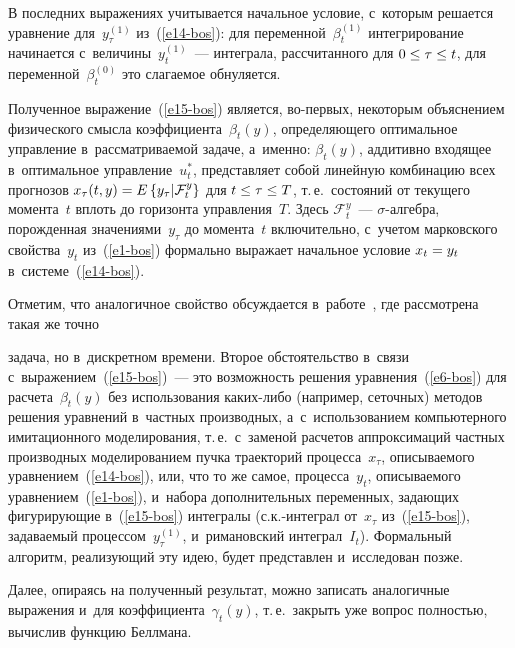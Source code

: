 \begin{multicols}{2}
     В последних выражениях учитывается начальное условие, с~которым 
решается уравнение для~$y_\tau^{(1)}$ из~(\ref{e14-bos}): для 
переменной~$\beta_t^{(1)}$ интегрирование начинается 
с~величины~$y_t^{(1)}$~--- интеграла, рассчитанного для $0\hm\leq \tau\hm\leq 
t$, для переменной~$\beta_t^{(0)}$ это слагаемое обнуляется.
     
     Полученное выражение~(\ref{e15-bos}) является, во-пер\-вых, 
некоторым объяснением физического смысла коэффициента~$\beta_t(y)$, 
определяющего оптимальное управление в~рассматриваемой задаче, 
а~именно: $\beta_t(y)$, аддитивно входящее в~оптимальное 
управление~$u_t^*$, представляет собой линейную комбинацию всех 
прогнозов $x_\tau(t,y)\hm= E\left\{ y_\tau\vert \mathcal{F}_t^y\right\}$ для 
$t\hm\leq \tau\hm\leq T$, т.\,е.\ состояний от текущего момента~$t$ вплоть до 
горизонта управления~$T$. Здесь $\mathcal{F}_t^y$~--- $\sigma$-ал\-геб\-ра, 
порожденная значениями~$y_\tau$ до момента~$t$ включительно, с~учетом 
марковского свойства~$y_t$ из~(\ref{e1-bos}) формально выражает 
начальное условие $x_t\hm=y_t$ в~системе~(\ref{e14-bos}).

     
     Отметим, что аналогичное свойство обсуждается  
в~работе~\cite{11-bos}, где рассмотрена такая же точно\linebreak\vspace*{-12pt}

\pagebreak

\noindent
 задача, но 
в~дискретном времени. Второе обстоятельство в~связи 
с~выражением~(\ref{e15-bos})~--- это возможность решения 
уравнения~(\ref{e6-bos}) для расчета~$\beta_t(y)$ без использования 
каких-либо (например, сеточных) методов решения уравнений в~частных 
производных, а~с~использованием компьютерного имитационного 
моделирования, т.\,е.\ с~заменой расчетов аппроксимаций частных 
производных моделированием пучка траекторий процесса~$x_\tau$, 
описываемого уравнением~(\ref{e14-bos}), или, что то же самое, 
процесса~$y_t$, описываемого уравнением~(\ref{e1-bos}), и~набора 
дополнительных переменных, задающих фи\-гу\-ри\-ру\-ющие в~(\ref{e15-bos}) 
интегралы (с.к.-ин\-те\-грал от~$x_{\tau}$ из~(\ref{e15-bos}), задаваемый 
процессом~$y_{\tau}^{(1)}$, и~римановский интеграл~$I_t$). Формальный 
алгоритм, реализующий эту идею, будет представлен и~исследован позже.
     
     Далее, опираясь на полученный результат, можно записать 
аналогичные выражения и~для коэффициента~$\gamma_t(y)$, т.\,е.\ закрыть 
уже вопрос полностью, вычислив функцию Беллмана.
     

\end{multicols}
